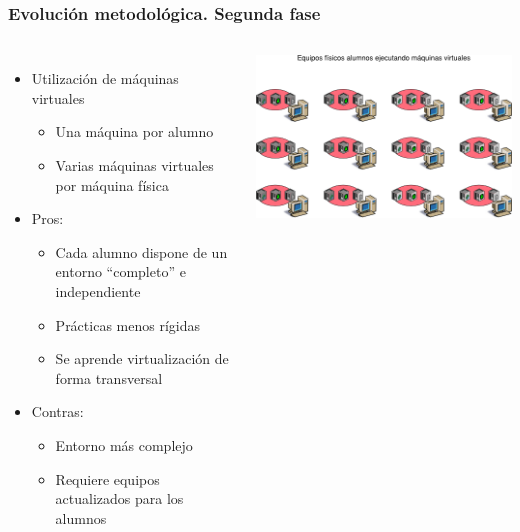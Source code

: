 \documentclass{beamer}
\begin{document}
\begin{frame}
  \frametitle{Evolución metodológica. Segunda fase}
  \begin{columns}
    \begin{itemize}
    \item Utilización de máquinas virtuales
      \begin{itemize}
      \item Una máquina por alumno
      \item Varias máquinas virtuales por máquina física
      \end{itemize}
      \item Pros:
      \begin{itemize}
      \item Cada alumno dispone de un entorno ``completo'' e independiente
      \item Prácticas menos rígidas
      \item Se aprende virtualización de forma transversal
      \end{itemize}
      \item Contras:
      \begin{itemize}
      \item Entorno más complejo
      \item Requiere equipos actualizados para los alumnos
      \end{itemize}
    \end{itemize}
    \includegraphics[width=\columnwidth]{../img/epoca2.png}
  \end{columns}
\end{frame}
\end{document}
